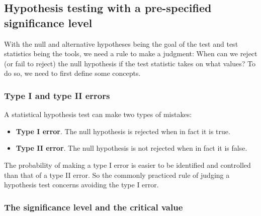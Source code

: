 \documentclass[a4paper,11pt]{article}
\begin{document}
\subsection{Hypothesis testing with a pre-specified significance level}
\label{sec:org41615d4}

With the null and alternative hypotheses being the goal of the test
and test statistics being the tools, we need a rule to make a
judgment: When can we reject (or fail to reject) the null hypothesis
if the test statistic takes on what values? To do so, we need to first
define some concepts. 

\subsubsection*{Type I and type II errors}
\label{sec:org734fad6}

A statistical hypothesis test can make two types of mistakes:
\begin{itemize}
\item \textbf{Type I error}. The null hypothesis is rejected when in fact it is
true.
\item \textbf{Type II error}. The null hypothesis is not rejected when in fact it
is false.
\end{itemize}

The probability of making a type I error is easier to be identified
and controlled than that of a type II error. So the commonly practiced
rule of judging a hypothesis test concerns avoiding the type I error.

\subsubsection*{The significance level and the critical value}
\label{sec:org4219d5c}
\end{document}

